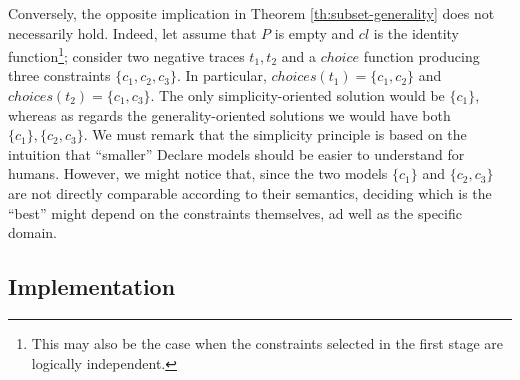 Conversely, the opposite implication in Theorem \ref{th:subset-generality} does not necessarily hold. Indeed, let assume that $P$ is empty and $cl$ is the identity function\footnote{This may also be the case when the constraints selected in the first stage are logically independent.}; consider two negative traces $t_1, t_2$ and a $choice$ function producing three constraints $\{c_1, c_2,c_3\}$. In particular, $choices(t_1)=\{c_1, c_2\}$ and $choices(t_2)=\{c_1, c_3\}$. The only simplicity-oriented solution would be  $\{c_1\}$, whereas as regards the generality-oriented solutions we would have both $\{c_1\}, \{c_2, c_3\}$. We must remark that the simplicity principle is based on the intuition that ``smaller'' Declare models should be easier to understand for humans. However, we might notice that, since the two models $\{c_1\}$ and $\{c_2, c_3\}$ are not directly comparable according to their semantics, deciding which is the ``best'' might depend on the constraints themselves, ad well as the specific domain.





\subsection{Implementation}


